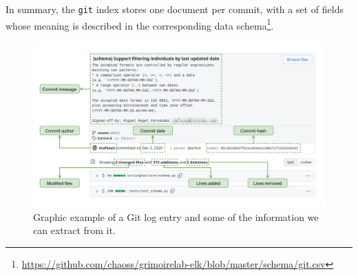 \documentclass[a4paper, 12pt]{book}
\begin{document}
In summary, the \texttt{git} index stores one document per commit, with a set of fields whose meaning is described in the corresponding data schema\footnote{\url{https://github.com/chaoss/grimoirelab-elk/blob/master/schema/git.csv}}.

\begin{figure}
  \centering
  \includegraphics[width=16cm, keepaspectratio]{img/example-commit-mafesan.drawio.png}
  \caption{Graphic example of a Git log entry and some of the information we can extract from it.}
  \label{fig:example-commit-github}
\end{figure}
\end{document}
